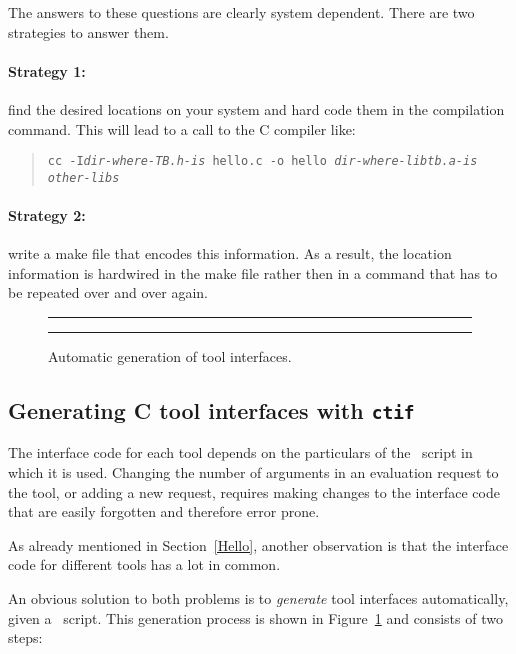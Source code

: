 The answers to these questions are clearly system dependent.
There are two strategies to answer them.

\paragraph{Strategy 1:} find the desired locations on your system and hard code them in
the compilation command. This will lead to a call to the C compiler
like:
\begin{quote}
{\tt cc -I{\em dir-where-TB.h-is} hello.c -o hello {\em dir-where-libtb.a-is} {\em other-libs}}
\end{quote}

\paragraph{Strategy 2:}  write a make file that encodes this information.
As a result, the location information is hardwired in the make file
rather then in a command that has to be repeated over and over again.

\begin{figure}
\rule{\textwidth}{0.5mm}
    
  \centerline{\box\graph}
  \caption{Automatic generation of tool interfaces.}
  \label{fig:Tifs}
\rule{\textwidth}{0.5mm}
\end{figure}

\subsection{\label{ctif}Generating C tool interfaces with {\tt ctif}}

The interface code for each tool depends on the particulars
of the \T\ script in which it is used. Changing the number
of arguments in an evaluation request to the tool,
or adding a new request, requires making changes to the interface
code that are easily forgotten and therefore error prone.

As already mentioned in Section~\ref{Hello}, another observation
is that the interface code for different tools has a lot in common.

An obvious solution to both problems is to {\em generate}
tool interfaces automatically, given a \T\ script.
This generation process is shown in Figure~\ref{fig:Tifs}
and consists of two steps:


